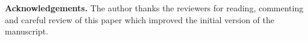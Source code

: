 \documentclass[12pt,a4paper,oneside]{article}
\def \newsection{\vspace{12pt}\textbf}
\begin{document}
{\bf Acknowledgements.} The author thanks the reviewers for reading, commenting and careful review of this paper which improved the initial version of the manuscript.

%
%
%


\end{document}

